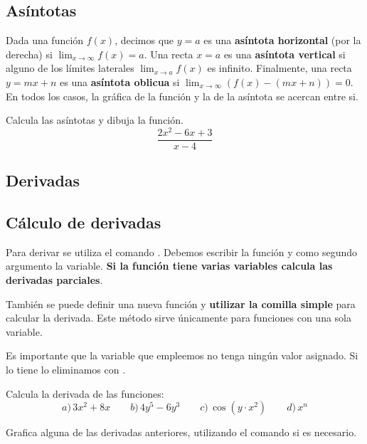 \documentclass[a4paper,10pt, draft]{article}
\newcommand{\com}[1]{\textbf{\color{blue}{#1}}}
\newenvironment{capitulo}{\begin{tcolorbox}[colback=red!5!white,colframe=red!75!black]}{\end{tcolorbox}\bigskip}
\newenvironment{ejer}{\begin{tcolorbox}[center title, title=Ejercicios,
fonttitle=\sffamily\bfseries,colback=blue!5,colframe=orange]}{\end{tcolorbox}}
\begin{document}
\subsection{Asíntotas}

 Dada una función $f(x)$, decimos que $y=a$ es una \textbf{asíntota horizontal} (por la derecha) si $\lim_{x\rightarrow \infty}f(x)=a$. Una recta $x=a$ es una \textbf{asíntota vertical} si alguno de los límites laterales $\lim_{x\rightarrow a} f(x)$ es infinito. Finalmente, una recta $y=mx+n$ es una \textbf{asíntota oblicua} si $\lim_{x\rightarrow \infty}(f(x)-(mx+n))=0$. En todos los casos, la gráfica de la función y la de la asíntota se acercan entre si.

\begin{ejer}

Calcula las asíntotas  y dibuja la función.
$$
\frac{2x^2-6x+3}{x-4}
$$


\end{ejer}  \newpage


\newpage


\begin{capitulo}

\section{Derivadas}


\end{capitulo}

\subsection{Cálculo de derivadas}

Para derivar se utiliza el comando \com{D[f,x]}. Debemos escribir la función y como segundo argumento la variable. \textbf{Si la función tiene varias variables calcula las derivadas parciales}.

También se puede definir una nueva función y \textbf{utilizar la comilla simple}  para calcular la derivada. Este método sirve únicamente para funciones con una sola variable.

Es importante que la variable que empleemos no tenga ningún valor asignado. Si lo tiene lo eliminamos con \com{Clear[var]}.

\begin{ejer}

Calcula la derivada de las funciones:
$$
a)\,3x^2+8x\qquad  b)\,4y^5-6y^3 \qquad c)\,\cos(y\cdot x^2)\qquad d)\, x^n
$$

Grafica alguna de las derivadas anteriores, utilizando el comando \com{Evaluate[expr]} si es necesario.

\end{ejer}  
\end{document}
